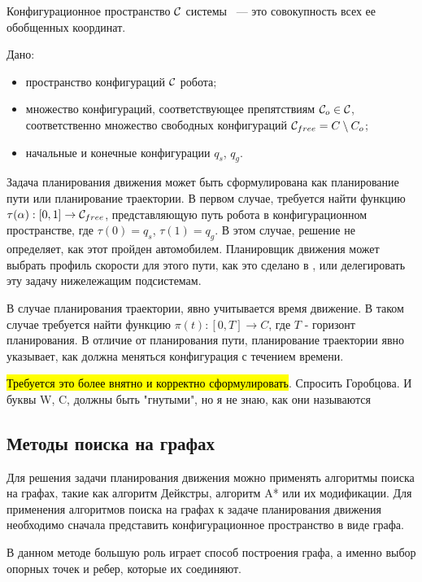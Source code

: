Конфигурационное пространство $\mathcal{C}$ системы ~--- это совокупность всех ее обобщенных координат.

Дано:
\begin{itemize}
    \item пространство конфигураций $\mathcal{C}$ робота;
    \item множество конфигураций, соответствующее препятствиям $\mathcal{C}_o \in \mathcal{C}$, соответственно
          множество свободных конфигураций $\mathcal{C}_{free} = C \setminus C_o$;
    \item начальные и конечные конфигурации $q_s$, $q_g$.
\end{itemize}

Задача планирования движения может быть сформулирована как планирование пути или планирование траектории.
В первом случае, требуется найти функцию $\tau(\alpha): [0,1] \rightarrow \mathcal{C}_{free}$, представляющую путь робота в
конфигурационном пространстве, где $\tau(0)=q_s$, $\tau(1)=q_g$. В этом случае, решение не определяет, как этот пройден
автомобилем. Планировщик движения может выбрать профиль скорости для этого пути, как это сделано в \cite{darpa_boss},
или делегировать эту задачу нижележащим подсистемам.

В случае планирования траектории, явно учитывается время движение. В таком случае требуется найти функцию
$\pi(t) : [0, T] \rightarrow C$, где $T$ - горизонт планирования. В отличие от планирования пути, планирование
траектории явно указывает, как должна меняться конфигурация с течением времени.

\hl{Требуется это более внятно и корректно сформулировать}.
Спросить Горобцова. И буквы W, C, должны быть "гнутыми", но я не знаю, как они называются

\subsection{Методы поиска на графах}
Для решения задачи планирования движения можно применять алгоритмы поиска на графах, такие как
алгоритм Дейкстры, алгоритм A* или их модификации. Для применения алгоритмов поиска на графах к задаче
планирования движения необходимо сначала представить конфигурационное пространство в виде графа.

В данном методе большую роль играет способ построения графа, а именно выбор опорных точек и ребер,
которые их соединяют.

